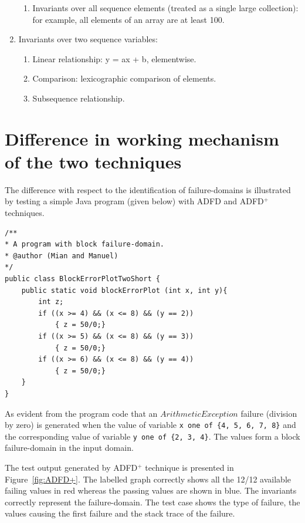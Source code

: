 \begin{enumerate}
\begin{enumerate}
	\item Invariants over all sequence elements (treated as a single large collection): for example, all elements of an array are at least 100.
	\end{enumerate}
\item Invariants over two sequence variables: 
	\begin{enumerate}
	\item Linear relationship: y = ax + b, elementwise. 
	\item Comparison: lexicographic comparison of elements. 
	\item Subsequence relationship.
	\end{enumerate}
\end{enumerate}








\section{Difference in working mechanism of the two techniques}
The difference with respect to the identification of failure-domains is illustrated by testing a simple Java program (given below) with ADFD and ADFD$^+$ techniques. 
\bigskip
\begin{lstlisting}
/** 
* A program with block failure-domain.
* @author (Mian and Manuel)
*/
public class BlockErrorPlotTwoShort {
	public static void blockErrorPlot (int x, int y){
		int z;
		if ((x >= 4) && (x <= 8) && (y == 2))
			{ z = 50/0;}
		if ((x >= 5) && (x <= 8) && (y == 3))
			{ z = 50/0;}
		if ((x >= 6) && (x <= 8) && (y == 4))
			{ z = 50/0;}
	}
}
\end{lstlisting}
\bigskip


As evident from the program code that an $ArithmeticException$ failure (division by zero) is generated when the value of variable \verb+x one of {4, 5, 6, 7, 8}+ and the corresponding value of variable \verb+y one of {2, 3, 4}+. The values form a block failure-domain in the input domain.

The test output generated by ADFD$^+$ technique is presented in Figure~\ref{fig:ADFD+}. The labelled graph correctly shows all the 12/12 available failing values in red whereas the passing values are shown in blue. The invariants correctly represent the failure-domain. The test case shows the type of failure, the values causing the first failure and the stack trace of the failure.


